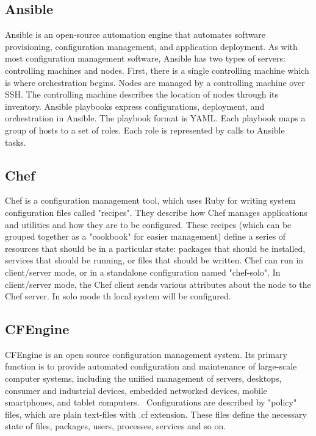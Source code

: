\subsection*{Ansible} \label{lang:ansible}
Ansible is an open-source automation engine that automates software provisioning, configuration management, and application deployment.
As with most configuration management software, Ansible has two types of servers: controlling machines and nodes.
First, there is a single controlling machine which is where orchestration begins.
Nodes are managed by a controlling machine over SSH.
The controlling machine describes the location of nodes through its inventory.
Ansible playbooks express configurations, deployment, and orchestration in Ansible.
The playbook format is YAML. 
Each playbook maps a group of hosts to a set of roles.
Each role is represented by calls to Ansible tasks.~\cite{ansible} 

\subsection*{Chef} \label{lang:shef}
Chef is a configuration management tool, which uses Ruby for writing system configuration files called "recipes".
They describe how Chef manages applications and utilities and how they are to be configured.
These recipes (which can be grouped together as a "cookbook" for easier management) define a series of resources that should be in a particular state: packages that should be installed, services that should be running, or files that should be written.
Chef can run in client/server mode, or in a standalone configuration named "chef-solo".
In client/server mode, the Chef client sends various attributes about the node to the Chef server. 
In solo mode th local system will be configured.~\cite{chef}

\subsection*{CFEngine}
CFEngine is an open source configuration management system.
Its primary function is to provide automated configuration and maintenance of large-scale computer systems, including the unified management of servers, desktops, consumer and industrial devices, embedded networked devices, mobile smartphones, and tablet computers.~\cite{cfengine}
Configurations are described by "policy" files, which are plain text-files with .cf extension.
These files define the necessary state of files, packages, users, processes, services and so on.~\cite{cfengine2}